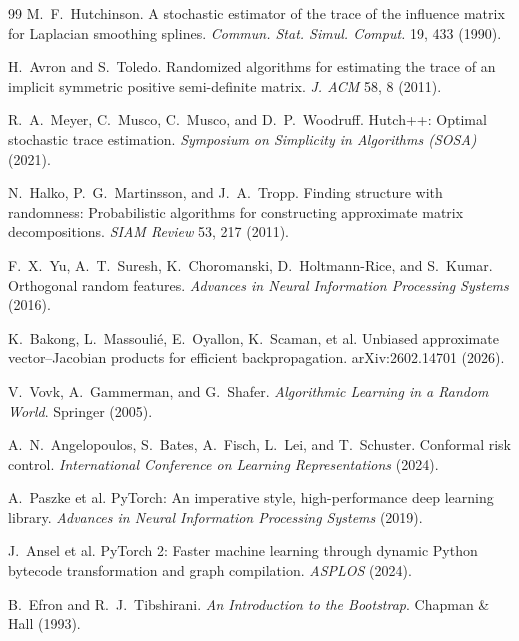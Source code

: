 \begin{thebibliography}{99}
M.~F.~Hutchinson.
\newblock A stochastic estimator of the trace of the influence matrix for Laplacian smoothing splines.
\newblock \emph{Commun. Stat. Simul. Comput.} 19, 433 (1990).

H.~Avron and S.~Toledo.
\newblock Randomized algorithms for estimating the trace of an implicit symmetric positive semi-definite matrix.
\newblock \emph{J. ACM} 58, 8 (2011).

R.~A.~Meyer, C.~Musco, C.~Musco, and D.~P.~Woodruff.
\newblock Hutch++: Optimal stochastic trace estimation.
\newblock \emph{Symposium on Simplicity in Algorithms (SOSA)} (2021).

N.~Halko, P.~G.~Martinsson, and J.~A.~Tropp.
\newblock Finding structure with randomness: Probabilistic algorithms for constructing approximate matrix decompositions.
\newblock \emph{SIAM Review} 53, 217 (2011).

F.~X.~Yu, A.~T.~Suresh, K.~Choromanski, D.~Holtmann-Rice, and S.~Kumar.
\newblock Orthogonal random features.
\newblock \emph{Advances in Neural Information Processing Systems} (2016).

K.~Bakong, L.~Massouli\'e, E.~Oyallon, K.~Scaman, et al.
\newblock Unbiased approximate vector--Jacobian products for efficient backpropagation.
\newblock arXiv:2602.14701 (2026).

V.~Vovk, A.~Gammerman, and G.~Shafer.
\newblock \emph{Algorithmic Learning in a Random World}. Springer (2005).

A.~N.~Angelopoulos, S.~Bates, A.~Fisch, L.~Lei, and T.~Schuster.
\newblock Conformal risk control.
\newblock \emph{International Conference on Learning Representations} (2024).

A.~Paszke et al.
\newblock PyTorch: An imperative style, high-performance deep learning library.
\newblock \emph{Advances in Neural Information Processing Systems} (2019).

J.~Ansel et al.
\newblock PyTorch 2: Faster machine learning through dynamic Python bytecode transformation and graph compilation.
\newblock \emph{ASPLOS} (2024).

B.~Efron and R.~J.~Tibshirani.
\newblock \emph{An Introduction to the Bootstrap}. Chapman \& Hall (1993).

\end{thebibliography}

